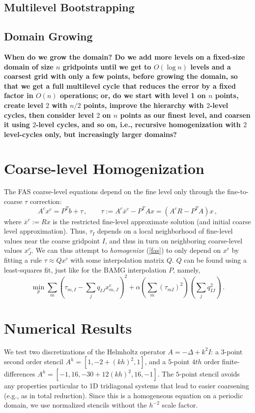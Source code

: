 \documentclass{article}
\begin{document}
\subsection{Multilevel Bootstrapping}

\subsection{Domain Growing}
{\bf When do we grow the domain? Do we add more levels on a fixed-size domain of size $n$ gridpoints until we get to $O(\log n)$ levels and a coarsest grid with only a few points, before growing the domain, so that we get a full multilevel cycle that reduces the error by a fixed factor in $O(n)$ operations; or, do we start with level 1 on $n$ points, create level $2$ with $n/2$ points, improve the hierarchy with $2$-level cycles, then consider level $2$ on $n$ points as our finest level, and coarsen it using $2$-level cycles, and so on, i.e., recursive homogenization with $2$ level-cycles only, but increasingly larger domains?}

\section{Coarse-level Homogenization}
The FAS coarse-level equations depend on the fine level only through the fine-to-coarse $\tau$ correction:
\begin{equation}
	A^c x^c = P^T b + \tau\,,\qquad \tau :=  A^c \overline{x}^c - P^T A x = (A^c R - P^T A) x\,,
	\label{fas}
\end{equation}
where $\overline{x}^c := R x$ is the restricted fine-level approximate solution (and initial coarse level approximation). Thus, $\tau_I$ depends on a local neighborhood of fine-level values near the coarse gridpoint $I$, and thus in turn on neighboring coarse-level values $x^c_J$. We can thus attempt to \emph{homogenize} (\ref{fas}) to only depend on $x^c$  by fitting a rule $\tau \approx Q x^c$ with some interpolation matrix $Q$. $Q$ can be found using a least-squares fit, just like for the BAMG interpolation $P$, namely,
\begin{equation}
	\min_p \sum_m \left( \tau_{m,I} - \sum_j q_{IJ} x^c_{m,J} \right)^2 + \alpha \left( \sum_m (\tau_{mI})^2 \right) \left(\sum_j q_{IJ}^2\right) \,.
\end{equation}

\section{Numerical Results}
We test two discretizations of the Helmholtz operator $A = -\Delta + k^2 I$: a $3$-point second order stencil $A^h = [1, -2 + (kh)^2, 1]$, and a $5$-point $4th$ order finite-differences $A^h = [-1, 16, -30 + 12 (kh)^2, 16, -1]$. The $5$-point stencil avoids any properties particular to 1D tridiagonal systems that lead to easier coarsening (e.g., as in total reduction). Since this is a homogeneous equation on a periodic domain, we use normalized stencils without the $h^{-2}$ scale factor.
\end{document}
